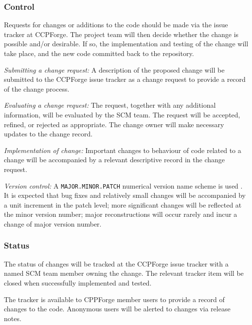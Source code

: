 \subsubsection{Control}

Requests for changes or additions to the code should be made via
the issue tracker at CCPForge. The project team will then decide
whether the change is possible and/or desirable. If so, the
implementation and testing of the change will take place, and the
new code committed back to the repository.

\textit{Submitting a change request:} A description of the proposed change
will be submitted to the CCPForge issue tracker as a change request to
provide a record of the change process.

\textit{Evaluating a change request:} The request, together with any
additional information, will be evaluated by the SCM team. The request
will be accepted, refined, or rejected as appropriate. The change owner
will make necessary updates to the change record.

\textit{Implementation of change:} Important changes to behaviour of code
related to a change will be
accompanied by a relevant descriptive record in the change request.

\textit{Version control:} A \texttt{MAJOR.MINOR.PATCH} numerical version
name scheme is used \cite{apacheAPR}.
It is expected that bug fixes and relatively
small changes will be accompanied by a unit increment in the patch level;
more significant changes will be reflected at the minor version number;
major reconstructions will occur rarely and incur a change of major version
number.

\subsubsection{Status}


The status of changes will be tracked at the CCPForge issue tracker
with a named SCM team member owning the change. The relevant tracker
item will be closed when successfully implemented and tested.

The tracker is available to CPPForge member users to provide a record
of changes to the code. Anonymous users will be alerted to changes via
release notes.


